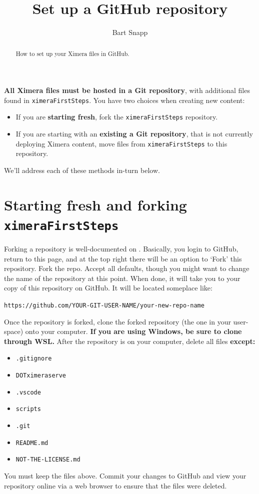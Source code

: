 \documentclass{ximera}
\title{Set up a GitHub repository}
\author{Bart Snapp}
\begin{document}
\begin{abstract}
  How to set up your Ximera files in GitHub.
\end{abstract}
\maketitle

\textbf{All Ximera files must be hosted in a Git repository}, with additional
files found in \verb!ximeraFirstSteps!. You have two choices when creating new
content:
\begin{itemize}
  \item If you are \textbf{starting fresh}, fork the \texttt{ximeraFirstSteps}
        repository.
  \item If you are starting with an \textbf{existing a Git repository}, that is
        not currently deploying Ximera content, move files
        from \texttt{ximeraFirstSteps} to this repository.
\end{itemize}
We'll address each of these methods in-turn below.

\section{Starting fresh and forking \texttt{ximeraFirstSteps}}

Forking a repository is well-documented on
.
Basically, you login to GitHub, return to this page, and at the top right there
will be an option to `Fork' this repository. Fork the repo. Accept all
defaults, though you might want to change the name of the repository at this
point. When done, it will take you to
your copy of this repository on GitHub. It will be located someplace like:
\begin{center}
  \texttt{https://github.com/YOUR-GIT-USER-NAME/your-new-repo-name}
\end{center}
Once the repository is forked, clone the forked repository (the one in your
user-space) onto your computer. \textbf{If you are using Windows, be sure to
  clone through WSL.}
After the repository is on your computer, delete all files \textbf{except:}
\begin{itemize}
  \item \texttt{.gitignore}
  \item \texttt{DOTximeraserve}
  \item \texttt{.vscode}
  \item \texttt{scripts}
  \item \texttt{.git}
  \item \texttt{README.md}
  \item \texttt{NOT-THE-LICENSE.md}
\end{itemize}
You must keep the files above.	Commit your changes to GitHub and view your
repository online via a web browser to ensure that the files were deleted.
\end{document}
